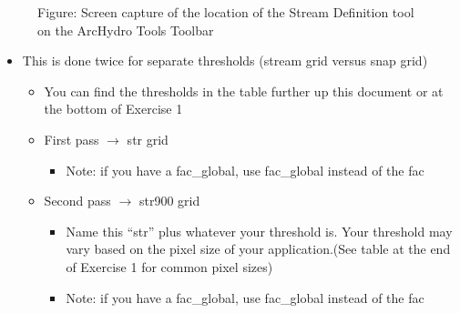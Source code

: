 \documentclass[letterpaper,10pt,english]{sphinxmanual}
\begin{document}
\begin{figure}[htbp]
\centering
\capstart

\noindent{}
\caption{Figure: Screen capture of the location of the Stream Definition tool on the ArcHydro Tools Toolbar}\label{\detokenize{ex_2:id6}}\end{figure}
\begin{itemize}
\item {} 
This is done twice for separate thresholds (stream grid versus snap grid)
\begin{itemize}
\item {} 
You can find the thresholds in the table further up this document or at the bottom of Exercise 1

\item {} 
First pass \(\rightarrow\) str grid
\begin{itemize}
\item {} 
Note: if you have a fac\_global, use fac\_global instead of the fac

\end{itemize}

\item {} 
Second pass \(\rightarrow\) str900 grid
\begin{itemize}
\item {} 
Name this “str” plus whatever your threshold is. Your threshold may vary based on the pixel size of your application.(See table at the end of Exercise 1 for common pixel sizes)

\item {} 
Note: if you have a fac\_global, use fac\_global instead of the fac

\end{itemize}

\end{itemize}

\end{itemize}
\end{document}
